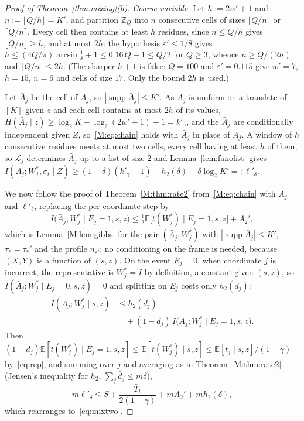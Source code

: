 \documentclass[aps,prx,twocolumn,superscriptaddress,nofootinbib,longbibliography]{revtex4-2}
\theoremstyle{plain}
\theoremstyle{definition}
\theoremstyle{remark}
\newcommand{\E}{\mathbb{E}}
\newcommand{\Z}{\mathbb{Z}}
\newcommand{\supp}{\operatorname{supp}}
\begin{document}
\begin{proof}[Proof of Theorem~\ref{thm:mixing}(b)]
\emph{Coarse variable.} Let $h:=2w'+1$ and $n:=\lfloor Q/h\rfloor=K'$, and partition $\Z_Q$ into $n$ consecutive cells of sizes $\lfloor Q/n\rfloor$ or $\lceil Q/n\rceil$. Every cell then contains at least $h$ residues, since $n\le Q/h$ gives $\lfloor Q/n\rfloor\ge h$, and at most $2h$: the hypothesis $\varepsilon'\le1/8$ gives $h\le(4Q/\pi)\arcsin\tfrac18+1\le0.16\,Q+1\le Q/2$ for $Q\ge3$, whence $n\ge Q/(2h)$ and $\lceil Q/n\rceil\le2h$. (The sharper $h+1$ is false: $Q=100$ and $\varepsilon'=0.115$ give $w'=7$, $h=15$, $n=6$ and cells of size $17$. Only the bound $2h$ is used.)

Let $\bar A_j$ be the cell of $A_j$, so $|\supp\bar A_j|\le K'$. As $A_j$ is uniform on a translate of $[K]$ given $z$ and each cell contains at most $2h$ of its values, $H(\bar A_j\mid z)\ge\log_2K-\log_2(2w'+1)-1=k'_\gamma$, and the $\bar A_j$ are conditionally independent given $Z$, so~\eqref{M:eq:chain} holds with $\bar A_j$ in place of $A_j$. A window of $h$ consecutive residues meets at most two cells, every cell having at least $h$ of them, so $\mathcal L_j$ determines $\bar A_j$ up to a list of size $2$ and Lemma~\ref{lem:fanolist} gives $I(\bar A_j;W^*_j,\sigma_t\mid Z)\ge(1-\delta)(k'_\gamma-1)-h_2(\delta)-\delta\log_2K'=:\ell'_\delta$.

We now follow the proof of Theorem~\ref{M:thm:rate2} from~\eqref{M:eq:chain} with $\bar A_j$ and $\ell'_\delta$, replacing the per-coordinate step by
\[
I\big(\bar A_j;W^*_j\mid E_j=1,s,z\big)\le\tfrac12\E\big[t(W^*_j)\mid E_j=1,s,z\big]+A_2',
\]
which is Lemma~\ref{M:lem:gibbs} for the pair $(\bar A_j,W^*_j)$ with $|\supp\bar A_j|\le K'$, $\tau_*=\tau_*'$ and the profile $n_{\varepsilon'}$; no conditioning on the frame is needed, because $(X,Y)$ is a function of $(s,z)$. On the event $E_j=0$, when coordinate $j$ is incorrect, the representative is $W^*_j=I$ by definition, a constant given $(s,z)$, so $I(\bar A_j;W^*_j\mid E_j=0,s,z)=0$ and splitting on $E_j$ costs only $h_2(d_j)$:
\[
\begin{aligned}I(\bar A_j;W^*_j\mid s,z)&\le h_2(d_j)\\&\quad+(1-d_j)\,I\big(\bar A_j;W^*_j\mid E_j=1,s,z\big).\end{aligned}
\]
Then $(1-d_j)\E[t(W^*_j)\mid E_j=1,s,z]\le\E[t(W^*_j)\mid s,z]\le\E[t_j\mid s,z]/(1-\gamma)$ by~\eqref{eq:rep}, and summing over $j$ and averaging as in Theorem~\ref{M:thm:rate2} (Jensen's inequality for $h_2$, $\sum_j\bar d_j\le m\delta$),
\[
m\ell'_\delta\le S+\frac{\bar T_t}{2(1-\gamma)}+mA_2'+mh_2(\delta),
\]
which rearranges to~\eqref{eq:mixtwo}.
\end{proof}
\end{document}
